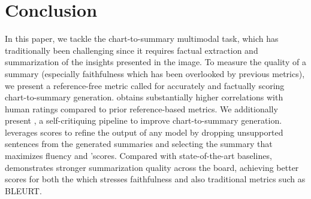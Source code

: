 \section{Conclusion}
In this paper, we tackle the chart-to-summary multimodal task, which has traditionally been challenging since it requires factual extraction and summarization of the insights presented in the image.
To measure the quality of a summary (especially faithfulness which has been overlooked by previous metrics), we present a reference-free metric called \metric{} \criticemoji{} for accurately and factually scoring chart-to-summary generation.
\metric{} obtains substantially higher correlations with human ratings compared to prior reference-based metrics. We additionally present \pipeline{} \piemoji, a self-critiquing pipeline to improve chart-to-summary generation. \pipeline{} leverages \metric{} scores to refine the output of any model by dropping unsupported sentences from the generated summaries and selecting the summary that maximizes fluency and \metric{}'scores. Compared with state-of-the-art baselines, \pipeline{} demonstrates stronger summarization quality across the board, achieving better scores for both the \metric which stresses faithfulness and also traditional metrics such as BLEURT.
